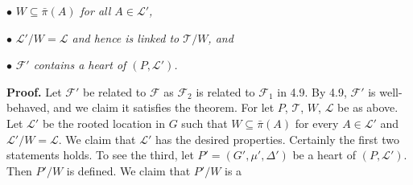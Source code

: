 \hspace*{12pt}$\bullet$ \textit{$W \subseteq \bar{\pi}(A)$ for all $A \in \mathcal{L}'$,}

\hspace*{12pt}$\bullet$ \textit{$\mathcal{L}'/W = \mathcal{L}$ and hence is linked to $\mathcal{T}/W$, and}

\hspace*{12pt}$\bullet$ \textit{$\mathcal{F}'$ contains a heart of $(P, \mathcal{L}')$.}

\textbf{Proof.} Let $\mathcal{F}'$ be related to $\mathcal{F}$ as $\mathcal{F}_2$ is related to $\mathcal{F}_1$ in 4.9. By 4.9, $\mathcal{F}'$ is well-behaved, and we claim it satisfies the theorem. For let $P$, $\mathcal{T}$, $W$, $\mathcal{L}$ be as above. Let $\mathcal{L}'$ be the rooted location in $G$ such that $W \subseteq \bar{\pi}(A)$ for every $A \in \mathcal{L}'$ and $\mathcal{L}'/W = \mathcal{L}$. We claim that $\mathcal{L}'$ has the desired properties. Certainly the first two statements holds. To see the third, let $P' = (G', \mu', \Delta')$ be a heart of $(P, \mathcal{L}')$. Then $P'/W$ is defined. We claim that $P'/W$ is a
